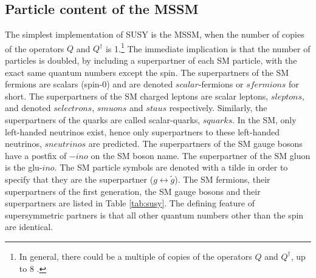 \subsection*{Particle content of the MSSM}
\noindent\justify
The simplest implementation of SUSY is the MSSM, when the number of copies of the operators $Q$ and $Q^{\dagger}$ is 1.\footnote{In general, there could be a multiple of copies of the operators $Q$ and $Q^{\dagger}$, up to 8 \cite{Haag:1974qh,Coleman:1967ad}.}
The immediate implication is that the number of particles is doubled, by including a superpartner of each SM particle, with the exact same quantum numbers except the spin. 
The superpartners of the SM fermions are scalars (spin-0) and are denoted $scalar$-fermions or $sfermions$ for short. 
The superpartners of the SM charged leptons are scalar leptons, $sleptons$, and denoted $selectrons$, $smuons$ and $staus$ respectively. 
Similarly, the superpartners of the quarks are called scalar-quarks, $squarks$. 
In the SM, only left-handed neutrinos exist, hence only superpartners to these left-handed neutrinos, $sneutrinos$ are predicted. 
The superpartners of the SM gauge bosons have a postfix of $-ino$ on the SM boson name. The superpartner of the SM gluon is the glu-$ino$. 
The SM particle symbols are denoted with a tilde in order to specify that they are the superpartner ($g\leftrightarrow\tilde{g}$). 
The SM fermions, their superpartners of the first generation, the SM gauge bosons and their superpartners are listed in Table \ref{tab:susy}.  
The defining feature of supersymmetric partners is that all other quantum numbers other than the spin are identical. 
